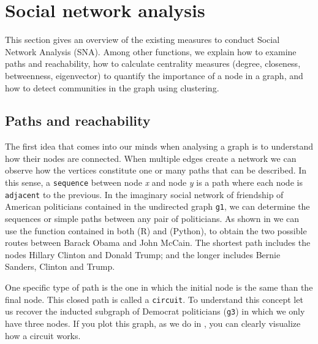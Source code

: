 \section{Social network analysis}
\label{sec:sna}

This section gives an overview of the existing measures to conduct Social Network Analysis (SNA). Among other functions, we explain how to examine paths and reachability, how to calculate centrality measures (degree, closeness, betweenness, eigenvector) to quantify the importance of a node in a graph, and how to detect communities in the graph using clustering.

\subsection{Paths and reachability}

The first idea that comes into our minds when analysing a graph is to understand how their nodes are connected. When multiple edges create a network we can observe how the vertices constitute one or many paths that can be described. In this sense, a \texttt{sequence} between node \textit{x} and node \textit{y} is a path where each node is \texttt{adjacent} to the previous. In the imaginary social network of friendship of American politicians contained in the undirected graph \texttt{g1}, we can determine the sequences or simple paths between any pair of politicians. As shown in  we can use the function  contained in both  (R) and  (Python), to obtain the two possible routes between Barack Obama and John McCain. The shortest path includes the nodes Hillary Clinton and Donald Trump; and the longer includes Bernie Sanders, Clinton and Trump.


One specific type of path is the one in which the initial node is the same than the final node. This closed path is called a \texttt{circuit}. To understand this concept let us recover the inducted subgraph of Democrat politicians (\texttt{g3}) in which we only have three nodes. If you plot this graph, as we do in , you can clearly visualize how a circuit works. 


